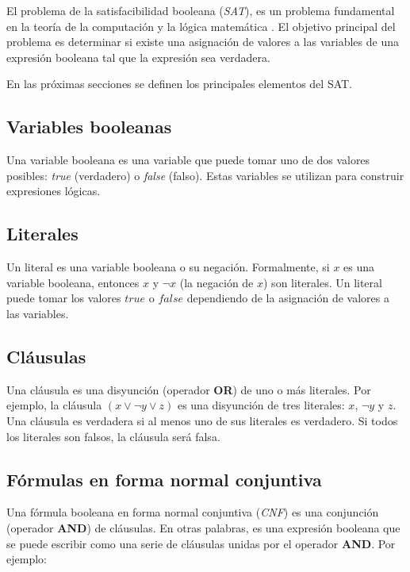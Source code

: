 \documentclass[12pt]{article}
\begin{document}
El problema de la satisfacibilidad booleana (\textit{SAT}), es un problema fundamental en la teoría de la 
computación y la lógica matemática \cite{authomataTheory}. El objetivo principal del problema es determinar si existe una asignación de valores a las variables de una expresión booleana tal que la expresión sea verdadera.

En las próximas secciones se definen los principales elementos del SAT.
\subsection{Variables booleanas}

Una variable booleana es una variable que puede tomar uno de dos valores posibles: \textit{true} (verdadero) o \textit{false} (falso). Estas variables se utilizan para construir expresiones lógicas.

\subsection{Literales}

Un literal es una variable booleana o su negación. Formalmente, si \( x \) es una variable booleana, entonces \( x \) y \( \neg x \) (la negación de \( x \)) son literales. Un literal puede tomar los valores \( true \) o \( false \) dependiendo de la asignación de valores a las variables.

\subsection{Cláusulas}

Una cláusula es una disyunción (operador \textbf{OR}) de uno o más literales. Por ejemplo, la cláusula \( (x \vee \neg y \vee z) \) es una disyunción de tres literales: \( x \), \( \neg y \) y \( z \). Una cláusula es verdadera si al menos uno de sus literales es verdadero. Si todos los literales son falsos, la cláusula será falsa.

\subsection{Fórmulas en forma normal conjuntiva}

Una fórmula booleana en forma normal conjuntiva (\textit{CNF}) es una conjunción (operador \textbf{AND}) de cláusulas. En otras palabras, es una expresión booleana que se puede escribir como una serie de cláusulas unidas por el operador \textbf{AND}. Por ejemplo:
\end{document}
